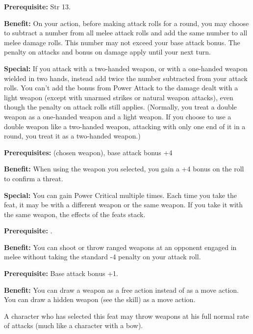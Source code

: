 
\textbf{Prerequisite:} Str 13.

\textbf{Benefit:} On your action, before making attack rolls for a round, you may 
choose to subtract a number from all melee attack rolls and add the same number 
to all melee damage rolls. This number may not exceed your base attack bonus. The 
penalty on attacks and bonus on damage apply until your next turn.

\textbf{Special:} If you attack with a two-handed weapon, or with a one-handed 
weapon wielded in two hands, instead add twice the number subtracted from your 
attack rolls. You can't add the bonus from Power Attack to the damage dealt with 
a light weapon (except with unarmed strikes or natural weapon attacks), even though 
the penalty on attack rolls still applies. (Normally, you treat a double weapon 
as a one-handed weapon and a light weapon. If you choose to use a double weapon 
like a two-handed weapon, attacking with only one end of it in a round, you treat 
it as a two-handed weapon.)


\textbf{Prerequisites:}  (chosen weapon), base attack bonus +4

\textbf{Benefit:} When using the weapon you selected, you gain a +4 bonus on the 
roll to confirm a threat.

\textbf{Special:} You can gain Power Critical multiple times. Each time you take the feat, it may 
be with a different weapon or the same weapon.  If you take it with the same weapon, 
the effects of the feats stack.


\textbf{Prerequisite:} .

\textbf{Benefit:} You can shoot or throw ranged weapons at an opponent engaged 
in melee without taking the standard -4 penalty on your attack roll.


\textbf{Prerequisite:} Base attack bonus +1.

\textbf{Benefit:} You can draw a weapon as a free action instead of as a move action. 
You can draw a hidden weapon (see the  skill) as a move action.

A character who has selected this feat may throw weapons at his full normal rate 
of attacks (much like a character with a bow).

